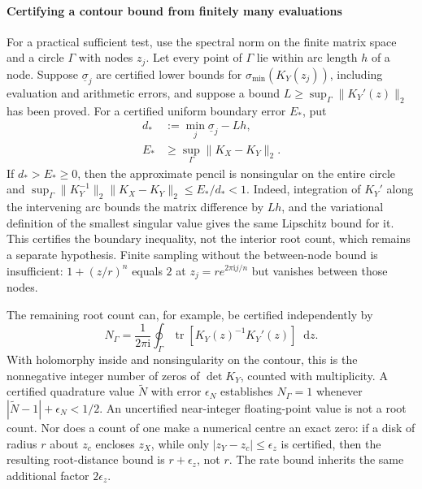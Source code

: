 \documentclass[final,5p,times,twocolumn,numbers,nopreprintline]{elsarticle}
\numberwithin{equation}{section}
\theoremstyle{definition}
\theoremstyle{remark}
\newcommand{\dd}{\mathop{}\!\mathrm d}
\newcommand{\ii}{\mathrm i}
\newcommand{\Tr}{\operatorname{tr}}
\begin{document}
\paragraph{Certifying a contour bound from finitely many evaluations}
For a practical sufficient test, use the spectral norm on the finite
matrix space and a circle \(\Gamma\) with nodes \(z_j\). Let every
point of \(\Gamma\) lie within arc length \(h\) of a node. Suppose
\(\underline\sigma_j\) are certified lower bounds for
\(\sigma_{\min}(K_Y(z_j))\), including evaluation and arithmetic
errors, and suppose a bound \(L\geq\sup_\Gamma\|K_Y'(z)\|_2\)
has been proved. For a certified uniform boundary error \(E_*\), put
\begin{equation}
 \begin{aligned}
  d_*&:=\min_j\underline\sigma_j-Lh,\\
  E_*&\geq\sup_\Gamma\|K_X-K_Y\|_2.
 \end{aligned}
 \label{eq:OQED-mesh-contour-margin}
\end{equation}
If \(d_*>E_*\geq0\), then the approximate pencil is nonsingular
on the entire circle and
\(\sup_\Gamma\|K_Y^{-1}\|_2\|K_X-K_Y\|_2\leq E_*/d_*<1\).
Indeed, integration of \(K_Y'\) along the intervening arc bounds
the matrix difference by \(Lh\), and the variational definition of
the smallest singular value gives the same Lipschitz bound for it.
This certifies the boundary inequality, not the interior root count,
which remains a separate hypothesis. Finite sampling without the
between-node bound is insufficient: \(1+(z/r)^n\) equals \(2\) at
\(z_j=r e^{2\pi\ii j/n}\) but vanishes between those nodes.

The remaining root count can, for example, be certified independently by
\begin{equation}
 N_\Gamma=\frac1{2\pi\ii}\oint_\Gamma
          \Tr[K_Y(z)^{-1}K_Y'(z)]\dd z.
 \label{eq:OQED-certified-root-count}
\end{equation}
With holomorphy inside and nonsingularity on the contour, this is the
nonnegative integer number of zeros of \(\det K_Y\), counted with
multiplicity. A certified quadrature value \(\widetilde N\) with
error \(\epsilon_N\) establishes \(N_\Gamma=1\) whenever
\(|\widetilde N-1|+\epsilon_N<1/2\). An uncertified near-integer
floating-point value is not a root count. Nor does a count of one make
a numerical centre an exact zero: if a disk of radius \(r\) about
\(z_c\) encloses \(z_X\), while only
\(|z_Y-z_c|\leq\epsilon_z\) is certified, then the resulting
root-distance bound is \(r+\epsilon_z\), not \(r\). The rate
bound inherits the same additional factor \(2\epsilon_z\).
\end{document}
